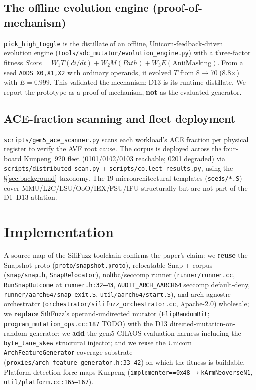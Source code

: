 \documentclass[sigplan,review,anonymous]{acmart}
\begin{document}
\subsection{The offline evolution engine (proof-of-mechanism)}
\texttt{pick\_high\_toggle} is the distillate of an offline, Unicorn-feedback-driven evolution engine (\texttt{tools/sdc\_mutator/evolution\_engine.py}) with a three-factor fitness $Score = W_1 T(di/dt) + W_2 M(Path) + W_3 E(\text{AntiMasking})$. From a seed \texttt{ADDS X0,X1,X2} with ordinary operands, it evolved $T$ from 8$\to$70 (8.8$\times$) with $E{=}0.999$. This validated the mechanism; D13 is its runtime distillate. We report the prototype as a proof-of-mechanism, \textbf{not} as the evaluated generator.

\subsection{ACE-fraction scanning and fleet deployment}
\texttt{scripts/gem5\_ace\_scanner.py} scans each workload's ACE fraction per physical register to verify the AVF root cause. The corpus is deployed across the four-board Kunpeng~920 fleet (0101/0102/0103 reachable; 0201 degraded) via \texttt{scripts/distributed\_scan.py} + \texttt{scripts/collect\_results.py}, using the \S\ref{sec:background} taxonomy. The 19 microarchitectural templates (\texttt{seeds/*.S}) cover MMU/L2C/LSU/OoO/IEX/FSU/IFU structurally but are not part of the D1--D13 ablation.

\section{Implementation}
\label{sec:impl}

A source map of the SiliFuzz toolchain confirms the paper's claim: we \textbf{reuse} the Snapshot proto (\texttt{proto/snapshot.proto}), relocatable Snap + corpus (\texttt{snap/snap.h}, \texttt{SnapRelocator}), nolibc/seccomp runner (\texttt{runner/runner.cc}, \texttt{RunSnapOutcome} at \texttt{runner.h:32--43}, \texttt{AUDIT\_ARCH\_AARCH64} seccomp default-deny, \texttt{runner/aarch64/snap\_exit.S}, \texttt{util/aarch64/start.S}), and arch-agnostic orchestrator (\texttt{orchestrator/silifuzz\_orchestrator.cc}, Apache-2.0) wholesale; we \textbf{replace} SiliFuzz's operand-undirected mutator (\texttt{FlipRandomBit}; \texttt{program\_mutation\_ops.cc:187} TODO) with the D13 directed-mutation-on-random generator; we \textbf{add} the gem5-CHAOS evaluation harness including the \texttt{byte\_lane\_skew} structural injector; and we reuse the Unicorn \texttt{ArchFeatureGenerator} coverage substrate (\texttt{proxies/arch\_feature\_generator.h:33--42}) on which the fitness is buildable. Platform detection force-maps Kunpeng (\texttt{implementer==0x48}$\to$\texttt{kArmNeoverseN1}, \texttt{util/platform.cc:165--167}).
\end{document}
